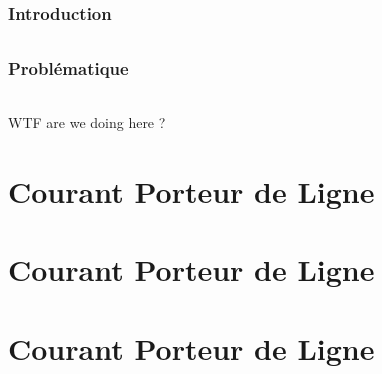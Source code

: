 
\section*{Introduction}
    \paragraph{}



\section*{Problématique}
    \paragraph{}
        WTF are we doing here ?



\part{Courant Porteur de Ligne}

\part{Courant Porteur de Ligne}

\part{Courant Porteur de Ligne}
